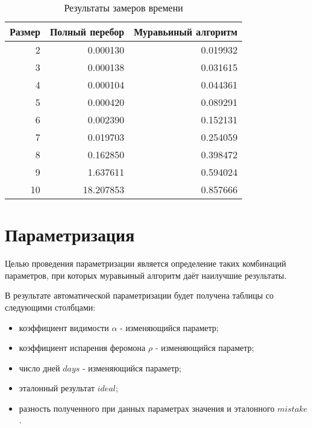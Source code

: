 \begin{table}[h]
    \begin{center}
    \captionsetup{justification=raggedright,singlelinecheck=off}
    \caption{\label{tbl:wor} Результаты замеров времени}
        \begin{tabular}{|r|r|r|}
            \hline Размер & Полный перебор & Муравьиный алгоритм \\ \hline
            2 &   0.000130 &   0.019932 \\ \hline
            3 &   0.000138 &   0.031615 \\ \hline
            4 &   0.000104 &   0.044361 \\ \hline
            5 &   0.000420 &   0.089291 \\ \hline
            6 &   0.002390 &   0.152131 \\ \hline
            7 &   0.019703 &   0.254059 \\ \hline
            8 &   0.162850 &   0.398472 \\ \hline
            9 &   1.637611 &   0.594024 \\ \hline
            10 &  18.207853 &  0.857666  \\ \hline
        \end{tabular}
    \end{center}
\end{table}




\section{Параметризация}

Целью проведения параметризации является определение таких комбинаций параметров, при которых муравьиный алгоритм даёт наилучшие результаты.

В результате автоматической параметризации будет получена таблицы со следующими столбцами:
\begin{itemize}
	\item коэффициент видимости $\alpha$ - изменяющийся параметр;
	\item коэффициент испарения феромона $\rho$ - изменяющийся параметр;
	\item число дней $days$ - изменяющийся параметр;
	\item эталонный результат $ideal$;
	\item разность полученного при данных параметрах значения и эталонного $mistake$.
\end{itemize}

